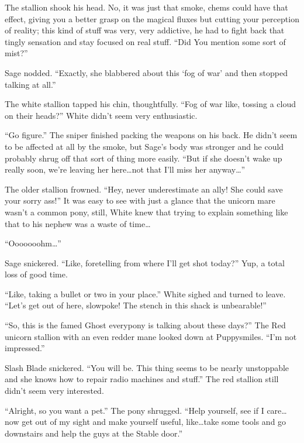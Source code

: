 The stallion shook his head. No, it was just that smoke, chems could have that effect, giving you a better grasp on the magical fluxes but cutting your perception of reality; this kind of stuff was very, very addictive, he had to fight back that tingly sensation and stay focused on real stuff. ``Did You mention some sort of mist?''

Sage nodded. ``Exactly, she blabbered about this `fog of war' and then stopped talking at all.''

The white stallion tapped his chin, thoughtfully. ``Fog of war like, tossing a cloud on their heads?'' White didn't seem very enthusiastic.

``Go figure.'' The sniper finished packing the weapons on his back. He didn't seem to be affected at all by the smoke, but Sage's body was stronger and he could probably shrug off that sort of thing more easily. ``But if she doesn't wake up really soon, we're leaving her here\dots not that I'll miss her anyway\dots''

The older stallion frowned. ``Hey, never underestimate an ally! She could save your sorry ass!'' It was easy to see with just a glance that the unicorn mare wasn't a common pony, still, White knew that trying to explain something like that to his nephew was a waste of time\dots

``Ooooooohm\dots''

Sage snickered. ``Like, foretelling from where I'll get shot today?'' Yup, a total loss of good time.

``Like, taking a bullet or two in your place.'' White sighed and turned to leave. ``Let's get out of here, slowpoke! The stench in this shack is unbearable!''

\horizonline


``So, this is the famed Ghost everypony is talking about these days?'' The Red unicorn stallion with an even redder mane looked down at Puppysmiles. ``I'm not impressed.''

Slash Blade snickered. ``You will be. This thing seems to be nearly unstoppable and she knows how to repair radio machines and stuff.'' The red stallion still didn't seem very interested.

``Alright, so you want a pet.'' The pony shrugged. ``Help yourself, see if I care\dots now get out of my sight and make yourself useful, like\dots take some tools and go downstairs and help the guys at the Stable door.''

